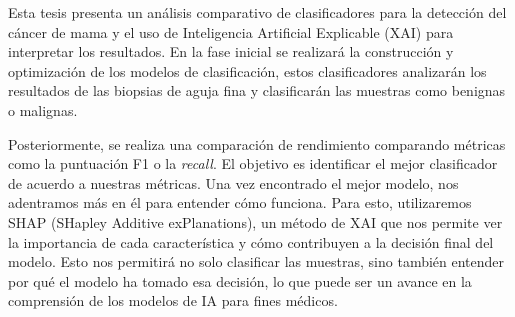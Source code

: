 Esta tesis presenta un análisis comparativo de clasificadores para la detección del cáncer de mama y el uso de Inteligencia Artificial Explicable (XAI) para interpretar los resultados. En la fase inicial se realizará la construcción y optimización de los modelos de clasificación, estos clasificadores analizarán los resultados de las biopsias de aguja fina y clasificarán las muestras como benignas o malignas.

Posteriormente, se realiza una comparación de rendimiento comparando métricas como la puntuación F1 o la \textit{recall}. El objetivo es identificar el mejor clasificador de acuerdo a nuestras métricas. Una vez encontrado el mejor modelo, nos adentramos más en él para entender cómo funciona. Para esto, utilizaremos SHAP (SHapley Additive exPlanations), un método de XAI que nos permite ver la importancia de cada característica y cómo contribuyen a la decisión final del modelo. Esto nos permitirá no solo clasificar las muestras, sino también entender por qué el modelo ha tomado esa decisión, lo que puede ser un avance en la comprensión de los modelos de IA para fines médicos.

